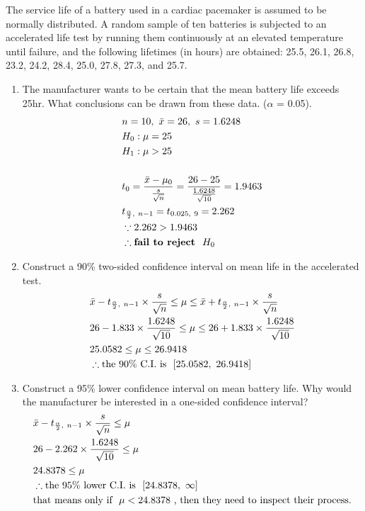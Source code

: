 The service life of a battery used in a cardiac pacemaker is assumed to be normally distributed. A random sample of ten batteries is subjected to an accelerated life test by running them continuously at an elevated temperature until failure, and the following lifetimes (in hours) are obtained: 25.5, 26.1, 26.8, 23.2, 24.2, 28.4, 25.0, 27.8, 27.3, and 25.7.

\begin{enumerate}
    \item The manufacturer wants to be certain that the mean battery life exceeds 25hr. What conclusions can be drawn from these data. ($\alpha$ = 0.05).
        \begin{align*}
            &n = 10, \ \Bar{x} = 26, \ s = 1.6248 \\
            &H_0: \mu = 25 \\
            &H_1: \mu > 25 \\
            & \\
            &t_0 = \frac{\Bar{x} - \mu_0}{\frac{s}{\sqrt{n}}} = \frac{26 - 25}{\frac{1.6248}{\sqrt{10}}} = 1.9463 \\
            &t_{\frac{\alpha}{2}, \ n-1} = t_{0.025, \ 9} = 2.262 \\
            &\because 2.262 > 1.9463\\
            &\therefore \textbf{fail to reject } \ H_0 \\
        \end{align*}
        
    \item Construct a 90\% two-sided confidence interval on mean life in the accelerated test.
        \begin{align*}
            &\Bar{x} - t_{\frac{\alpha}{2}, \ n-1} \times \frac{s}{\sqrt{n}} \leq \mu \leq \Bar{x} + t_{\frac{\alpha}{2}, \ n-1} \times \frac{s}{\sqrt{n}} \\
            &26 - 1.833 \times \frac{1.6248}{\sqrt{10}} \leq \mu \leq 26 + 1.833 \times \frac{1.6248}{\sqrt{10}} \\
            &25.0582 \leq \mu \leq 26.9418 \\
            &\therefore \text{the 90\% C.I. is } \ [25.0582, \ 26.9418]\\
        \end{align*}
        
    \item Construct a 95\% lower confidence interval on mean battery life. Why would the manufacturer be interested in a one-sided confidence interval?
        \begin{align*}
            &\Bar{x} - t_{\frac{\alpha}{2}, \ n-1} \times \frac{s}{\sqrt{n}} \leq \mu \\
            &26 - 2.262 \times \frac{1.6248}{\sqrt{10}} \leq \mu \\
            &24.8378 \leq \mu \\
            &\therefore \text{the 95\% lower C.I. is } \ [24.8378, \ \infty]\\
            &\text{that means only if } \  \mu < 24.8378 \ \text{, then they need to inspect their process.}
        \end{align*}
        
\end{enumerate}
